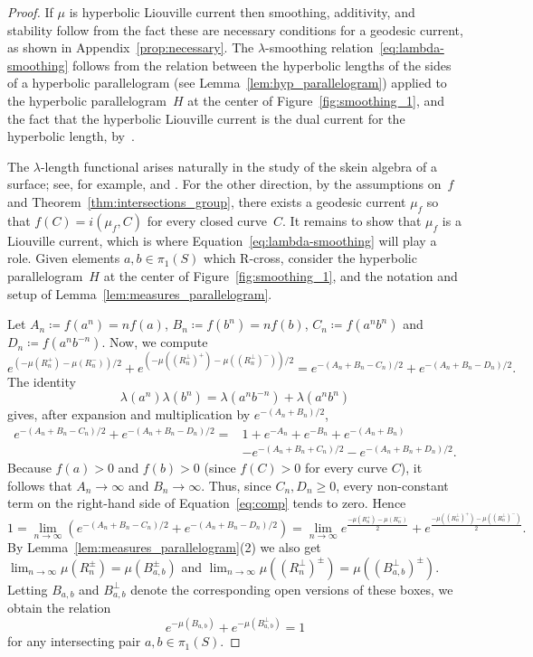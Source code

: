 \begin{proof}
If $\mu$ is hyperbolic Liouville current then smoothing, additivity, and
stability follow from the fact these are necessary conditions for a
geodesic current, as shown in Appendix~\ref{prop:necessary}. The
$\lambda$-smoothing relation~\eqref{eq:lambda-smoothing} follows from
the relation between the hyperbolic lengths of the sides of a
hyperbolic parallelogram (see Lemma~\ref{lem:hyp_parallelogram})
applied to the hyperbolic parallelogram~$H$ at the center of
Figure~\ref{fig:smoothing_1}, and the fact that the hyperbolic Liouville current is the dual current for the hyperbolic length, by~\cite[Proposition~14]{Bonahon88:GeodesicCurrent}.

The $\lambda$-length functional arises naturally in the study of the
skein algebra of a surface; see, for example,
\cite[Secs.~1--2]{Pen12:Decorated} and
\cite[Sec.~3]{Thurston14:PBI}.
For the other direction, by the assumptions on~$f$ and
Theorem~\ref{thm:intersections_group}, there exists a
geodesic current $\mu_f$ so that $f(C)=i(\mu_f,C)$ for every closed
curve~$C$.
It remains to show that $\mu_f$ is a Liouville current, which is where Equation~\eqref{eq:lambda-smoothing} will play a role.
Given elements $a, b \in \pi_1(S)$ which R-cross, consider the hyperbolic parallelogram~$H$ at the center of
Figure~\ref{fig:smoothing_1}, and the notation and setup of Lemma~\ref{lem:measures_parallelogram}.

Let $A_n \coloneqq f(a^n)=nf(a)$, $B_n \coloneqq f(b^n)=nf(b)$, $C_n \coloneqq f(a^nb^n)$ and $D_n \coloneqq f(a^n b^{-n})$.
Now, we compute
\[
e^{(-\mu(R_n^+)-\mu(R_n^-))/2} + e^{(-\mu((R_n^{\perp})^+)-\mu((R_n^{\perp})^-))/2} = e^{-(A_n+B_n-C_n)/2} + e^{-(A_n+B_n-D_n)/2}.
\]
The identity
\[
\lambda(a^n)\lambda(b^n)
=\lambda(a^n b^{-n})+\lambda(a^n b^n)
\]
gives, after expansion and multiplication by $e^{-(A_n+B_n)/2}$,
\begin{equation}
\begin{aligned}
e^{-(A_n+B_n-C_n)/2}+e^{-(A_n+B_n-D_n)/2}
={}&1+e^{-A_n}+e^{-B_n}+e^{-(A_n+B_n)}\\
&-e^{-(A_n+B_n+C_n)/2}
-e^{-(A_n+B_n+D_n)/2}.
\end{aligned}
\label{eq:comp}
\end{equation}
Because $f(a)>0$ and $f(b)>0$ (since $f(C)>0$ for every curve $C$), it follows that $A_n \to \infty$ and $B_n \to \infty$. 
Thus, since $C_n, D_n \geq 0$, every non-constant term on the
right-hand side of Equation~\ref{eq:comp} tends to zero. Hence
\[
1 = \lim_{n\to\infty}
\left(e^{-(A_n+B_n-C_n)/2}+e^{-(A_n+B_n-D_n)/2}\right)
= \lim_{n\to\infty} e^{\frac{-\mu(R_n^+)-\mu(R_n^-)}{2}} + e^{\frac{-\mu((R_n^{\perp})^+)-\mu((R_n^{\perp})^-)}{2}}.
\]
By Lemma~\ref{lem:measures_parallelogram}(2) we also get $\lim_{n \to \infty} \mu(R_n^{\pm})=\mu(B_{a,b}^{\pm})$ and $\lim_{n \to \infty} \mu((R_n^{\perp})^{\pm})=\mu((B_{a,b}^{\perp})^{\pm})$.
 Letting $B_{a,b}$ and $B_{a,b}^\perp$ denote the corresponding open versions of these boxes, we obtain the relation
\[
e^{-\mu(B_{a,b})} + e^{-\mu(B_{a,b}^{\perp})} =1
\]
for any intersecting pair $a,b \in \pi_1(S)$.


\end{proof}
